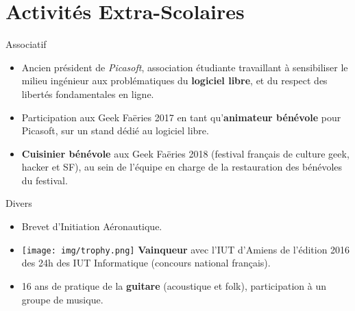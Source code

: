 \documentclass[a4paper]{twentysecondcv} %
\begin{document}
\section{Activités Extra-Scolaires}
\begin{twenty}
    \twentyitem
    	{}
		{}
        {Associatif}
        {}
        {}
        {\begin{itemize}
        \item Ancien président de \textit{Picasoft}, association étudiante travaillant à sensibiliser le milieu ingénieur aux problématiques du \textbf{logiciel libre}, et du respect des libertés fondamentales en ligne.
        \item Participation aux Geek Faëries 2017 en tant qu'\textbf{animateur bénévole} pour Picasoft, sur un stand dédié au logiciel libre.
        \item \textbf{Cuisinier bénévole} aux Geek Faëries 2018 (festival français de culture geek, hacker et SF), au sein de l'équipe en charge de la restauration des bénévoles du festival.
        \end{itemize}}
    \twentyitem
        {}
                {}
        {Divers}
        {}
        {}
        {\begin{itemize}
        \item Brevet d'Initiation Aéronautique.
        \item \texttt{[image: img/trophy.png]} \textbf{Vainqueur} avec l'IUT d'Amiens de l'édition 2016 des 24h des IUT Informatique (concours national français).
        \item 16 ans de pratique de la \textbf{guitare} (acoustique et folk), participation à un groupe de musique.
        \end{itemize}}
\end{twenty}
\end{document}
